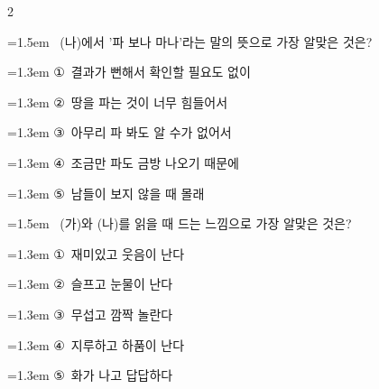 \documentclass[12pt, a4paper]{article}
\begin{document}
\begin{multicols}{2}
\noindent\begin{minipage}{\columnwidth}
\vspace{2mm}
{\hangindent=1.5em  ~(나)에서 '파 보나 마나'라는 말의 뜻으로 가장 알맞은 것은?\par}

\vspace{0.5mm}
{\hangindent=1.3em  \noindent\hspace{0.3em}①~결과가 뻔해서 확인할 필요도 없이\par}
{\hangindent=1.3em  \noindent\hspace{0.3em}②~땅을 파는 것이 너무 힘들어서\par}
{\hangindent=1.3em  \noindent\hspace{0.3em}③~아무리 파 봐도 알 수가 없어서\par}
{\hangindent=1.3em  \noindent\hspace{0.3em}④~조금만 파도 금방 나오기 때문에\par}
{\hangindent=1.3em  \noindent\hspace{0.3em}⑤~남들이 보지 않을 때 몰래\par}
\vspace{4mm}
\end{minipage}
\par

\noindent\begin{minipage}{\columnwidth}
\vspace{2mm}
{\hangindent=1.5em  ~(가)와 (나)를 읽을 때 드는 느낌으로 가장 알맞은 것은?\par}

\vspace{0.5mm}
{\hangindent=1.3em  \noindent\hspace{0.3em}①~재미있고 웃음이 난다\par}
{\hangindent=1.3em  \noindent\hspace{0.3em}②~슬프고 눈물이 난다\par}
{\hangindent=1.3em  \noindent\hspace{0.3em}③~무섭고 깜짝 놀란다\par}
{\hangindent=1.3em  \noindent\hspace{0.3em}④~지루하고 하품이 난다\par}
{\hangindent=1.3em  \noindent\hspace{0.3em}⑤~화가 나고 답답하다\par}
\vspace{4mm}
\end{minipage}
\par


\end{multicols}
\end{document}
